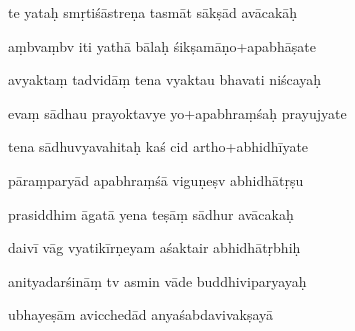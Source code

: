 \documentclass[article,12pt,a4paper]{memoir}%
\newcounter{parCount}
\begin{document}
	  
	  \pstart \leavevmode%
	te yataḥ smṛtiśāstreṇa tasmāt sākṣād avācakāḥ 
	{}
	\pend%
      

	  
	  \pstart {} aṃbvaṃbv iti yathā bālaḥ śikṣamāṇo+apabhāṣate 
	{}
	\pend%
      

	  
	  \pstart \leavevmode%
	avyaktaṃ tadvidāṃ tena vyaktau bhavati niścayaḥ 
	{}
	\pend%
      

	  
	  \pstart {} evaṃ sādhau prayoktavye yo+apabhraṃśaḥ prayujyate 
	{}
	\pend%
      

	  
	  \pstart \leavevmode%
	tena sādhuvyavahitaḥ kaś cid artho+abhidhīyate 
	{}
	\pend%
      

	  
	  \pstart {} pāraṃparyād apabhraṃśā viguṇeṣv abhidhātṛṣu 
	{}
	\pend%
      

	  
	  \pstart \leavevmode%
	prasiddhim āgatā yena teṣāṃ sādhur avācakaḥ 
	{}
	\pend%
      

	  
	  \pstart {} daivī vāg vyatikīrṇeyam aśaktair abhidhātṛbhiḥ 
	{}
	\pend%
      

	  
	  \pstart \leavevmode%
	anityadarśināṃ tv asmin vāde buddhiviparyayaḥ 
	{}
	\pend%
      

	  
	  \pstart {} ubhayeṣām avicchedād anyaśabdavivakṣayā 
	{}
	\pend%
      
\end{document}
